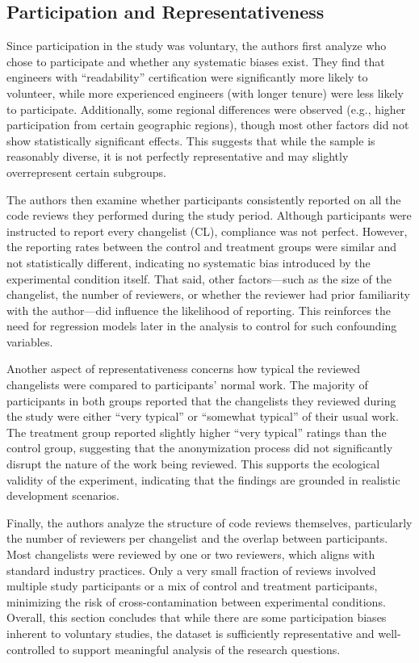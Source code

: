 \subsection{Participation and Representativeness}
Since participation in the study was voluntary, the authors first analyze who chose to participate and whether any systematic biases exist. They find that engineers with “readability” certification were significantly more likely to volunteer, while more experienced engineers (with longer tenure) were less likely to participate. Additionally, some regional differences were observed (e.g., higher participation from certain geographic regions), though most other factors did not show statistically significant effects. This suggests that while the sample is reasonably diverse, it is not perfectly representative and may slightly overrepresent certain subgroups.

The authors then examine whether participants consistently reported on all the code reviews they performed during the study period. Although participants were instructed to report every changelist (CL), compliance was not perfect. However, the reporting rates between the control and treatment groups were similar and not statistically different, indicating no systematic bias introduced by the experimental condition itself. That said, other factors—such as the size of the changelist, the number of reviewers, or whether the reviewer had prior familiarity with the author—did influence the likelihood of reporting. This reinforces the need for regression models later in the analysis to control for such confounding variables.

Another aspect of representativeness concerns how typical the reviewed changelists were compared to participants’ normal work. The majority of participants in both groups reported that the changelists they reviewed during the study were either “very typical” or “somewhat typical” of their usual work. The treatment group reported slightly higher “very typical” ratings than the control group, suggesting that the anonymization process did not significantly disrupt the nature of the work being reviewed. This supports the ecological validity of the experiment, indicating that the findings are grounded in realistic development scenarios.

Finally, the authors analyze the structure of code reviews themselves, particularly the number of reviewers per changelist and the overlap between participants. Most changelists were reviewed by one or two reviewers, which aligns with standard industry practices. Only a very small fraction of reviews involved multiple study participants or a mix of control and treatment participants, minimizing the risk of cross-contamination between experimental conditions. Overall, this section concludes that while there are some participation biases inherent to voluntary studies, the dataset is sufficiently representative and well-controlled to support meaningful analysis of the research questions.

